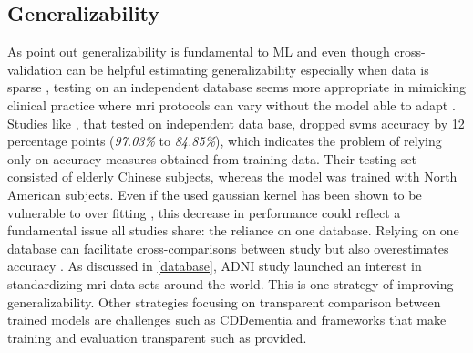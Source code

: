 \subsection{Generalizability}
As \textcite{foundationof} point out generalizability is fundamental to \gls{ML} and even though cross-validation can be helpful estimating generalizability especially when data is sparse \autocite{introtostat}, testing on an independent database seems more appropriate in mimicking clinical practice where \gls{mri} protocols can vary without the model able to adapt \autocite{bron}. Studies like \textcite{liPredictionClinicalBiomarker2020}, that tested on independent data base, dropped \gls{svm}s accuracy by 12 percentage points (\textit{97.03\%} to \textit{84.85\%}), which indicates the problem of relying only on accuracy measures obtained from training data. Their testing set consisted of elderly Chinese subjects, whereas the model was trained with North American subjects. Even if the used gaussian kernel has been shown to be vulnerable to over fitting \autocite{gausover}, this decrease in performance could reflect a fundamental issue all studies share: the reliance on one database. Relying on one database can facilitate cross-comparisons between study but also overestimates accuracy \autocite{pellegriniMachineLearningNeuroimaging2018}. As discussed in \ref{database}, ADNI study launched an interest in standardizing \gls{mri} data sets around the world. This is one strategy of improving generalizability. Other strategies focusing on transparent comparison between trained models are challenges such as CDDementia \autocite{bron} and frameworks that make training and evaluation transparent such as \textcite{wenConvolutionalNeuralNetworks2020} provided. 

